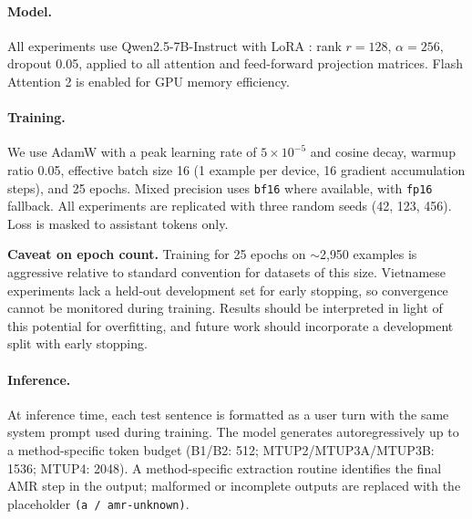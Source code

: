 \paragraph{Model.}
All experiments use Qwen2.5-7B-Instruct with LoRA \citep{hu2021lora}:
rank $r=128$, $\alpha=256$, dropout 0.05, applied to all attention and
feed-forward projection matrices. Flash Attention 2 is enabled for GPU memory
efficiency.

\paragraph{Training.}
We use AdamW with a peak learning rate of $5 \times 10^{-5}$ and cosine decay,
warmup ratio 0.05, effective batch size 16 (1 example per device,
16 gradient accumulation steps), and 25 epochs. Mixed precision uses
\texttt{bf16} where available, with \texttt{fp16} fallback. All experiments
are replicated with three random seeds (42, 123, 456). Loss is masked to
assistant tokens only.

\textbf{Caveat on epoch count.} Training for 25 epochs on $\sim$2{,}950
examples is aggressive relative to standard convention for datasets of this
size. Vietnamese experiments lack a held-out development set for early stopping,
so convergence cannot be monitored during training. Results should be
interpreted in light of this potential for overfitting, and future work should
incorporate a development split with early stopping.

\paragraph{Inference.}
At inference time, each test sentence is formatted as a user turn with the
same system prompt used during training. The model generates autoregressively
up to a method-specific token budget (B1/B2: 512; MTUP2/MTUP3A/MTUP3B: 1536;
MTUP4: 2048). A method-specific extraction routine identifies the final AMR
step in the output; malformed or incomplete outputs are replaced with the
placeholder \texttt{(a / amr-unknown)}.
